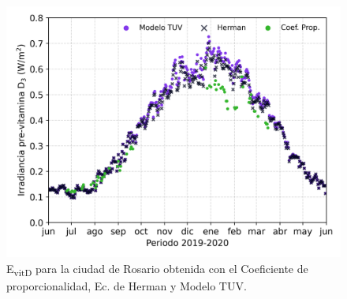 \documentclass[10pt,twocolumn]{article}
\begin{document}
\begin{figure}[ht]
  \centering
  \includegraphics[scale=0.47]{Max_previtamin_D.png}
  \caption{E\textsubscript{vitD} para la ciudad de Rosario obtenida con el Coeficiente de proporcionalidad, Ec. de Herman y Modelo TUV.}
  \label{fig:previtamin}
\end{figure}
\end{document}
